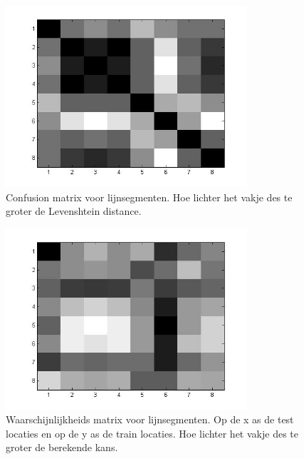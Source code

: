 \documentclass[a4paper]{article}
\begin{document}
\begin{figure}[h]
	\centering
	\includegraphics[width=0.8\textwidth]{confusion_line.jpg}
	\caption{Confusion matrix voor lijnsegmenten. Hoe lichter het vakje des te groter de Levenshtein distance.}
	\label{fig:confusion_line}
\end{figure}

\begin{figure}[h]
	\centering
	\includegraphics[width=0.8\textwidth]{line_prob.jpg}
	\caption{Waarschijnlijkheids matrix voor lijnsegmenten. Op de x as de test locaties en op de y as de train locaties. Hoe lichter het vakje des te groter de berekende kans.}
	\label{fig:line_prob}
\end{figure}
\end{document}
